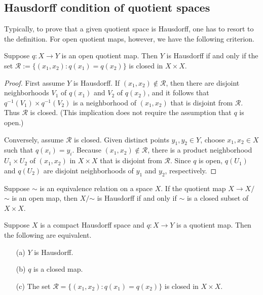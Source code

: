 \subsection{Hausdorff condition of quotient spaces}
Typically, to prove that a given quotient space is Hausdorff, one has to resort to the definition. For open quotient maps, however, we have the following criterion.
\begin{proposition}\label{quotient Hausdorff}
Suppose $q:X\to Y$ is an open quotient map. Then $Y$ is Hausdorff if and only if the set $\mathcal{R}:=\{(x_1,x_2):q(x_1)=q(x_2)\}$ is closed in $X\times X$.
\end{proposition}
\begin{proof}
First assume $Y$ is Hausdorff. If $(x_1,x_2)\notin\mathcal{R}$, then there are disjoint neighborhoods $V_1$ of $q(x_1)$ and $V_2$ of $q(x_2)$, and it follows that $q^{-1}(V_1)\times q^{-1}(V_2)$ is a neighborhood of $(x_1,x_2)$ that is disjoint from $\mathcal{R}$. Thus $\mathcal{R}$ is closed. (This implication does not require the assumption that $q$ is open.)\par
Conversely, assume $\mathcal{R}$ is closed. Given distinct points $y_1,y_2\in Y$, choose $x_1,x_2\in X$ such that $q(x_i)=y_i$. Because $(x_1,x_2)\notin\mathcal{R}$, there is a product neighborhood $U_1\times U_2$ of $(x_1,x_2)$ in $X\times X$ that is disjoint from $\mathcal{R}$. Since $q$ is open, $q(U_1)$ and $q(U_2)$ are disjoint neighborhoods of $y_1$ and $y_2$, respectively.
\end{proof}
\begin{corollary}
Suppose $\sim$ is an equivalence relation on a space $X$. If the quotient map $X\to X/$$\sim$ is an open map, then $X/$$\sim$ is Hausdorff if and only if $\sim$ is a closed subset of $X\times X$.
\end{corollary}
\begin{theorem}
Suppose $X$ is a compact Hausdorff space and $q:X\to Y$ is a quotient map. Then the following are equivalent.
\begin{itemize}
\item[(a)] $Y$ is Hausdorff.
\item[(b)] $q$ is a closed map.
\item[(c)] The set $\mathcal{R}=\{(x_1,x_2):q(x_1)=q(x_2)\}$ is closed in $X\times X$.
\end{itemize}
\end{theorem}
